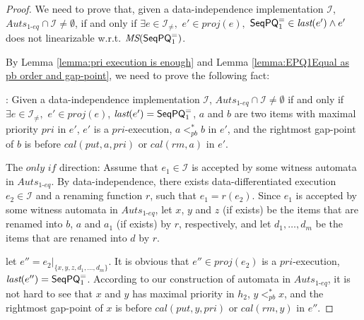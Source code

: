 \begin {proof}

We need to prove that, given a data-independence implementation $\mathcal{I}$, $\textit{Auts}_{\textit{1-eq}} \cap \mathcal{I} \neq \emptyset$, if and only if $\exists e \in \mathcal{I}_{\neq},$ $e' \in \textit{proj}(e),$ $\mathsf{SeqPQ}_1^{=} \in \textit{last}(e') \wedge e'$ does not linearizable w.r.t. $\textit{MS}(\mathsf{SeqPQ}_1^{=})$.

By Lemma \ref{lemma:pri execution is enough} and Lemma \ref{lemma:EPQ1Equal as pb order and gap-point}, we need to prove the following fact:

: Given a data-independence implementation $\mathcal{I}$, $\textit{Auts}_{\textit{1-eq}} \cap \mathcal{I} \neq \emptyset$ if and only if $\exists e \in \mathcal{I}_{\neq},$ $e' \in \textit{proj}(e)$, $\textit{last}(e')=\mathsf{SeqPQ}_1^{=}$, $a$ and $b$ are two items with maximal priority $\textit{pri}$ in $e'$, $e'$ is a $\textit{pri}$-execution, $a <_{\textit{pb}}^* b$ in $e'$, and the rightmost gap-point of $b$ is before $\textit{cal}(\textit{put},a,\textit{pri})$ or $\textit{cal}(\textit{rm},a)$ in $e'$.

\noindent The $\textit{only if}$ direction: Assume that $e_1 \in \mathcal{I}$ is accepted by some witness automata in $\textit{Auts}_{\textit{1-eq}}$. By data-independence, there exists data-differentiated execution $e_2 \in \mathcal{I}$ and a renaming function $r$, such that $e_1=r(e_2)$. Since $e_1$ is accepted by some witness automata in  $\textit{Auts}_{\textit{1-eq}}$, let $x$, $y$ and $z$ (if exists) be the items that are renamed into $b$, $a$ and $a_1$ (if exists) by $r$, respectively, and let $d_1,\ldots,d_m$ be the items that are renamed into $d$ by $r$.

let $e'' = e_2 \vert_{ \{ x,y,z,d_1,\ldots,d_m \} }$. It is obvious that $e'' \in \textit{proj}(e_2)$ is a $\textit{pri}$-execution, $\textit{last}(e'') = \mathsf{SeqPQ}_1^{=}$. According to our construction of automata in $\textit{Auts}_{\textit{1-eq}}$, it is not hard to see that $x$ and $y$ has maximal priority in $h_2$, $y <_{\textit{pb}}^* x$, and the rightmost gap-point of $x$ is before $\textit{cal}(\textit{put},y,\textit{pri})$ or $\textit{cal}(\textit{rm},y)$ in $e''$.


\end{proof}
